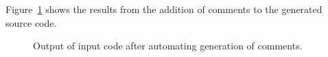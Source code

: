    Figure~\ref{Tutorial:exampleOutput_addComments} 
shows the results from the addition of comments to the generated source code.

\begin{figure}[!h]
{\indent
{\mySmallFontSize

\begin{latexonly}
   
\end{latexonly}

\begin{htmlonly}
   
\end{htmlonly}

}
}
\caption{Output of input code after automating generation of comments.}
\label{Tutorial:exampleOutput_addComments}
\end{figure}



























